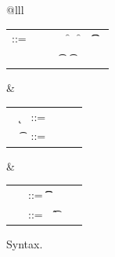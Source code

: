 \documentclass[acmlarge, anonymous, authordraft, review]{acmart} %
\begin{document}
\begin{figure}[!h]\hrulefill

\vspace{4mm}

\small\begin{tabular}{@{}lll}

\begin{minipage}{9cm}\begin{tabular}{@{}l@{~}l@{}l@{}l@{}l@{}l@{}l@{}l}
\e\hspace{.1cm} ::= & \hspace{.2cm} \x        
    &\B \this         
   &\B \that      
   &\B \FRead\f     
   &\B \FWrite\f\e   
   &\B \KCall\e\m\e\t\t \\
   & &
   &\B \SubCast\t\e 
   &\B \BehCast\t\e 
   &\B \New\C{\e[1]..}  
   &\B \DynCall\e\m\e 
\end{tabular}\end{minipage}&
\begin{minipage}{3.4cm}\begin{tabular}{l@{~}l@{}l@{}l}
   ~ \k &::= \Class \C {\fd[1]..}{\md[1]..} \\
~ \t&::= ~ \any  \B   \C  \\ 
\end{tabular}\end{minipage} &
\begin{minipage}{3.0cm}\begin{tabular}{l@{~}l@{}l@{}l}
\md &::= \Mdef\m\x\t\t\e \\
~\fd&::= ~ \Fdef\f\t \\ 
\end{tabular}\end{minipage}\end{tabular}

\vspace{4mm}

\noindent\hrulefill
\caption{\kafka Syntax.}\label{syn}
\end{figure}
\end{document}
